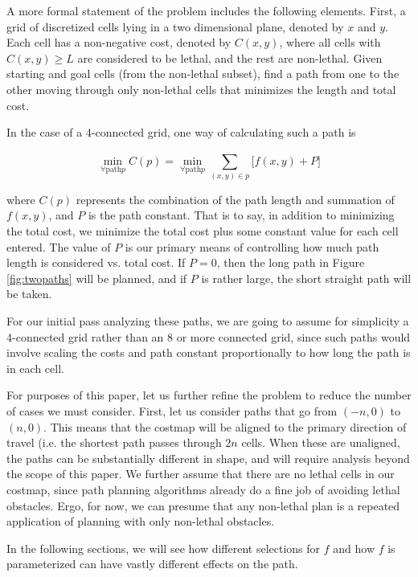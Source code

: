 A more formal statement of the problem includes the following elements. First, a grid of discretized cells lying in a two dimensional plane, denoted by $x$ and $y$. Each cell has a non-negative cost, denoted by $C(x,y)$, where all cells with $C(x,y)\ge L$ are considered to be lethal, and the rest are non-lethal.  Given starting and goal cells (from the non-lethal subset), find a path from one to the other moving through only non-lethal cells that minimizes the length and total cost. 

In the case of a 4-connected grid, one way of calculating such a path is

\[ \min_{\forall \mathrm{path} p} C(p) = \min_{\forall \mathrm{path} p} \sum\limits_{(x,y) \in p}^{} \Big[ f(x,y) + P \Big] \]

where $C(p)$ represents the combination of the path length and summation of $f(x,y)$, and $P$ is the path constant. That is to say, in addition to minimizing the total cost, we minimize the total cost plus some constant value for each cell entered. The value of $P$ is our primary means of controlling how much path length is considered vs. total cost. If $P=0$, then the long path in Figure \ref{fig:twopaths} will be planned, and if $P$ is rather large, the short straight path will be taken. 


For our initial pass analyzing these paths, we are going to assume for simplicity a 4-connected grid rather than an 8 or more connected grid, since such paths would involve scaling the costs and path constant proportionally to how long the path is in each cell. 

For purposes of this paper, let us further refine the problem to reduce the number of cases we must consider. First, let us consider paths that go from $(-n, 0)$ to $(n, 0)$. This means that the costmap will be aligned to the primary direction of travel (i.e. the shortest path passes through $2n$ cells. When these are unaligned, the paths can be substantially different in shape, and will require analysis beyond the scope of this paper. We further assume that there are no lethal cells in our costmap, since path planning algorithms already do a fine job of avoiding lethal obstacles. Ergo, for now, we can presume that any non-lethal plan is a repeated application of planning with only non-lethal obstacles. 

In the following sections, we will see how different selections for $f$ and how $f$ is parameterized can have vastly different effects on the path. 
